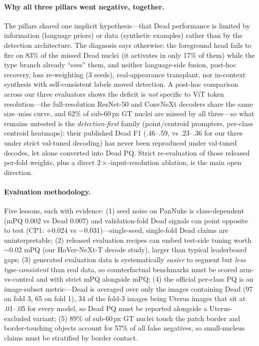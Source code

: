 \documentclass[11pt]{article}
\begin{document}
\paragraph{Why all three pillars went negative, together.} The pillars shared one implicit
hypothesis---that Dead performance is limited by information (language priors) or data
(synthetic examples) rather than by the detection architecture. The diagnosis says otherwise:
the foreground head fails to fire on 83\% of the missed Dead nuclei (it activates in only 17\%
of them) while the type branch already ``sees'' them, and neither language-side fusion, post-hoc
recovery, loss re-weighting
(3 seeds), real-appearance transplant, nor in-context synthesis with self-consistent labels
moved detection. A post-hoc comparison across our three evaluators shows the deficit is
\emph{not} specific to ViT token resolution---the full-resolution ResNet-50 and ConvNeXt
decoders share the same size--miss curve, and 62\% of sub-60\,px GT nuclei are missed by all
three---so what remains untested is the \emph{detection-first} family (point/centroid
prompters, per-class centroid heatmaps): their published Dead F1 (.46--.59, vs .23--.36 for
our three under strict val-tuned decoding) has never been reproduced under val-tuned decodes,
let alone converted into Dead PQ. Strict re-evaluation of those released per-fold weights,
plus a direct $2\times$-input-resolution ablation, is the main open direction.

\paragraph{Evaluation methodology.} Five lessons, each with evidence: (1) seed noise on PanNuke is
class-dependent (mPQ 0.002 vs Dead 0.007) and validation-fold Dead signals can point opposite
to test (CP1: $+0.024$ vs $-0.031$)---single-seed, single-fold Dead claims are uninterpretable;
(2) released evaluation recipes can embed test-side tuning worth $\sim$0.02 mPQ (our
HoVer-NeXt-T decode study), larger than typical leaderboard gaps; (3) generated evaluation data
is systematically \emph{easier} to segment but \emph{less type-consistent} than real data, so
counterfactual benchmarks must be scored arm-vs-control and with strict mPQ alongside mPQ;
(4) the official per-class PQ is an image-subset metric---Dead is averaged over only the images
containing Dead (97 on fold 3, 65 on fold 1), 34 of the fold-3 images being Uterus images that
sit at .01--.05 for every model, so Dead PQ must be reported alongside a Uterus-excluded
variant; (5) 89\% of sub-60\,px GT nuclei touch the patch border and border-touching objects
account for 57\% of all false negatives, so small-nucleus claims must be stratified by border
contact.
\end{document}
